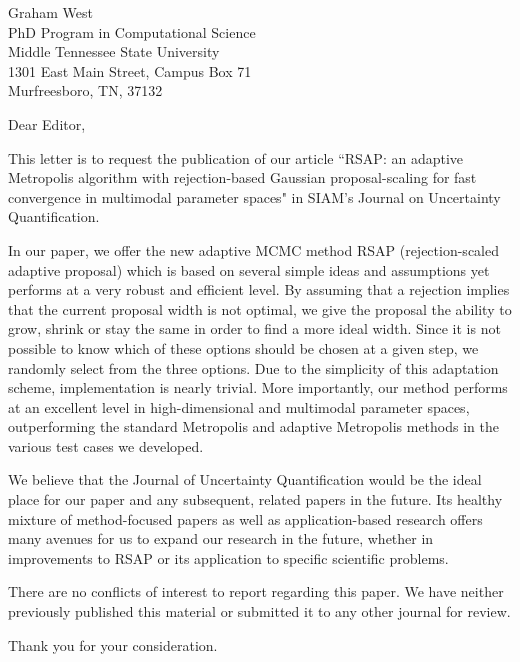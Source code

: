 \documentclass{letter}
\begin{document}
\begin{letter}{
Graham West \\
PhD Program in Computational Science \\
Middle Tennessee State University \\
1301 East Main Street, Campus Box 71 \\
Murfreesboro, TN, 37132
}

\begin{comment}

Questions:

Too much "simple" in second paragraph


\end{comment}

\opening{Dear Editor,}
This letter is to request the publication of our article ``RSAP: an adaptive Metropolis algorithm with rejection-based Gaussian proposal-scaling for fast convergence in multimodal parameter spaces" in SIAM's Journal on Uncertainty Quantification.

In our paper, we offer the new adaptive MCMC method RSAP (rejection-scaled adaptive proposal) which is based on several simple ideas and assumptions yet performs at a very robust and efficient level. By assuming that a rejection implies that the current proposal width is not optimal, we give the proposal the ability to grow, shrink or stay the same in order to find a more ideal width. Since it is not possible to know which of these options should be chosen at a given step, we randomly select from the three options. Due to the simplicity of this adaptation scheme, implementation is nearly trivial. More importantly, our method performs at an excellent level in high-dimensional and multimodal parameter spaces, outperforming the standard Metropolis and adaptive Metropolis methods in the various test cases we developed.

We believe that the Journal of Uncertainty Quantification would be the ideal place for our paper and any subsequent, related papers in the future. Its healthy mixture of method-focused papers as well as application-based research offers many avenues for us to expand our research in the future, whether in improvements to RSAP or its application to specific scientific problems.

There are no conflicts of interest to report regarding this paper. We have neither previously published this material or submitted it to any other journal for review. 

Thank you for your consideration.


\end{letter}
\end{document}
